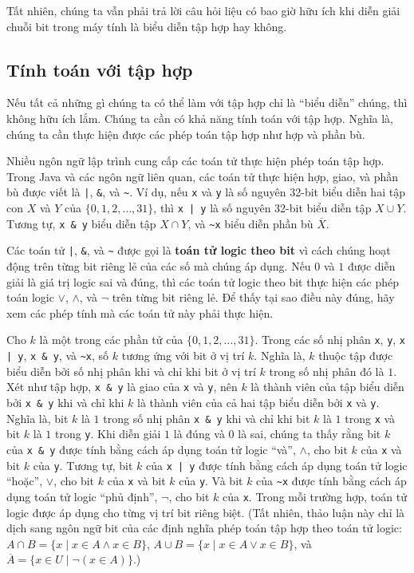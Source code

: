 Tất nhiên, chúng ta vẫn phải trả lời câu hỏi liệu có bao giờ hữu ích khi diễn giải chuỗi bit trong máy tính là biểu diễn tập hợp hay không.

\subsection{Tính toán với tập hợp}

Nếu tất cả những gì chúng ta có thể làm với tập hợp chỉ là ``biểu diễn'' chúng, thì không hữu ích lắm. Chúng ta cần có khả năng tính toán với tập hợp. Nghĩa là, chúng ta cần thực hiện được các phép toán tập hợp như hợp và phần bù.

Nhiều ngôn ngữ lập trình cung cấp các toán tử thực hiện phép toán tập hợp. Trong Java và các ngôn ngữ liên quan, các toán tử thực hiện hợp, giao, và phần bù được viết là \texttt{|}, \texttt{\&}, và \texttt{\~{}}. Ví dụ, nếu \texttt{x} và \texttt{y} là số nguyên 32-bit biểu diễn hai tập con $X$ và $Y$ của $\{0, 1, 2, \ldots, 31\}$, thì \texttt{x | y} là số nguyên 32-bit biểu diễn tập $X \cup Y$. Tương tự, \texttt{x \& y} biểu diễn tập $X \cap Y$, và \texttt{\~{}x} biểu diễn phần bù $\overline{X}$.

Các toán tử \texttt{|}, \texttt{\&}, và \texttt{\~{}} được gọi là \textbf{toán tử logic theo bit} vì cách chúng hoạt động trên từng bit riêng lẻ của các số mà chúng áp dụng. Nếu $0$ và $1$ được diễn giải là giá trị logic sai và đúng, thì các toán tử logic theo bit thực hiện các phép toán logic $\lor$, $\land$, và $\neg$ trên từng bit riêng lẻ. Để thấy tại sao điều này đúng, hãy xem các phép tính mà các toán tử này phải thực hiện.

Cho $k$ là một trong các phần tử của $\{0, 1, 2, \ldots, 31\}$. Trong các số nhị phân \texttt{x}, \texttt{y}, \texttt{x | y}, \texttt{x \& y}, và \texttt{\~{}x}, số $k$ tương ứng với bit ở vị trí $k$. Nghĩa là, $k$ thuộc tập được biểu diễn bởi số nhị phân khi và chỉ khi bit ở vị trí $k$ trong số nhị phân đó là $1$. Xét như tập hợp, \texttt{x \& y} là giao của \texttt{x} và \texttt{y}, nên $k$ là thành viên của tập biểu diễn bởi \texttt{x \& y} khi và chỉ khi $k$ là thành viên của cả hai tập biểu diễn bởi \texttt{x} và \texttt{y}. Nghĩa là, bit $k$ là $1$ trong số nhị phân \texttt{x \& y} khi và chỉ khi bit $k$ là $1$ trong \texttt{x} và bit $k$ là $1$ trong \texttt{y}. Khi diễn giải $1$ là đúng và $0$ là sai, chúng ta thấy rằng bit $k$ của \texttt{x \& y} được tính bằng cách áp dụng toán tử logic ``và'', $\land$, cho bit $k$ của \texttt{x} và bit $k$ của \texttt{y}. Tương tự, bit $k$ của \texttt{x | y} được tính bằng cách áp dụng toán tử logic ``hoặc'', $\lor$, cho bit $k$ của \texttt{x} và bit $k$ của \texttt{y}. Và bit $k$ của \texttt{\~{}x} được tính bằng cách áp dụng toán tử logic ``phủ định'', $\neg$, cho bit $k$ của \texttt{x}. Trong mỗi trường hợp, toán tử logic được áp dụng cho từng vị trí bit riêng biệt. (Tất nhiên, thảo luận này chỉ là dịch sang ngôn ngữ bit của các định nghĩa phép toán tập hợp theo toán tử logic: $A \cap B = \{x \mid x \in A \land x \in B\}$, $A \cup B = \{x \mid x \in A \lor x \in B\}$, và $\overline{A} = \{x \in U \mid \neg(x \in A)\}$.)

